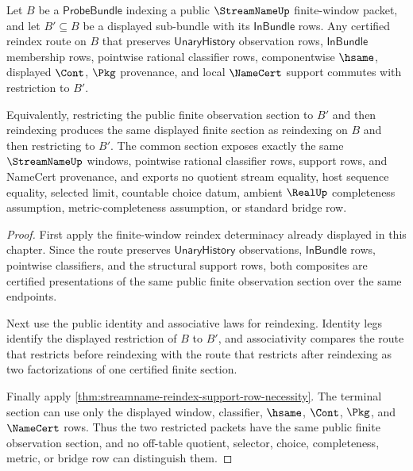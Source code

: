 \begin{theorem}
\label{thm:streamname-reindex-bundle-naturality}
Let $B$ be a $\mathsf{ProbeBundle}$ indexing a public $\StreamNameUp$
finite-window packet, and let $B'\subseteq B$ be a displayed sub-bundle with
its $\mathsf{InBundle}$ rows. Any certified reindex route on $B$ that
preserves $\mathsf{UnaryHistory}$ observation rows, $\mathsf{InBundle}$
membership rows, pointwise rational classifier rows, componentwise $\hsame$,
displayed $\Cont$, $\Pkg$ provenance, and local $\NameCert$ support commutes
with restriction to $B'$.

Equivalently, restricting the public finite observation section to $B'$ and
then reindexing produces the same displayed finite section as reindexing on
$B$ and then restricting to $B'$. The common section exposes exactly the same
$\StreamNameUp$ windows, pointwise rational classifier rows, support rows, and
NameCert provenance, and exports no quotient stream equality, host sequence
equality, selected limit, countable choice datum, ambient $\RealUp$
completeness assumption, metric-completeness assumption, or standard bridge
row.
\end{theorem}
\begin{proof}
First apply the finite-window reindex determinacy already displayed in this
chapter. Since the route preserves $\mathsf{UnaryHistory}$ observations,
$\mathsf{InBundle}$ rows, pointwise classifiers, and the structural support
rows, both composites are certified presentations of the same public finite
observation section over the same endpoints.

Next use the public identity and associative laws for reindexing. Identity
legs identify the displayed restriction of $B$ to $B'$, and associativity
compares the route that restricts before reindexing with the route that
restricts after reindexing as two factorizations of one certified finite
section.

Finally apply \autoref{thm:streamname-reindex-support-row-necessity}. The
terminal section can use only the displayed window, classifier, $\hsame$,
$\Cont$, $\Pkg$, and $\NameCert$ rows. Thus the two restricted packets have
the same public finite observation section, and no off-table quotient,
selector, choice, completeness, metric, or bridge row can distinguish them.
\end{proof}
